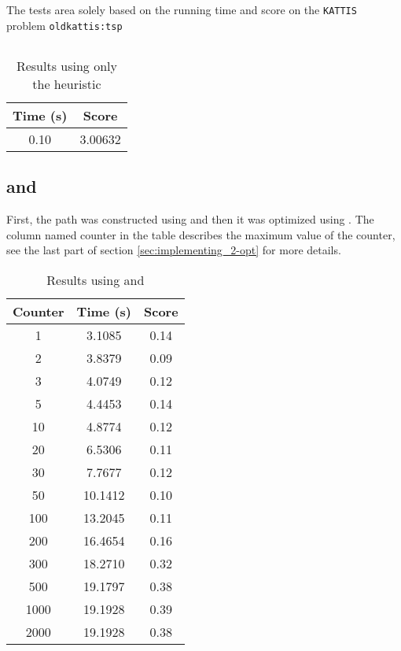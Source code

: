 The tests area solely based on the running time and score on the
\texttt{KATTIS}~\cite{kattis} problem \texttt{oldkattis:tsp}~\cite{kattis-tsp}

\subsection{}
\begin{table}[ht!]
    \centering
    \begin{tabular}{|c|c|}
        \hline 
        \textbf{Time (s)} & \textbf{Score} \\ \hline
        0.10 & 3.00632 \\ \hline
    \end{tabular}
    \caption{Results using only the  heuristic}
    \label{table:nn}
\end{table}

\subsection{ and }
First, the path was constructed using  and then it was
optimized using . The column named counter in the table describes
the maximum value of the counter, see the last part of section
\ref{sec:implementing_2-opt} for more details.
\begin{table}[ht!]
    \centering
    \begin{tabular}{|c|c|c|}
        \hline
        \textbf{Counter} & \textbf{Time (s)} & \textbf{Score} \\ \hline
            1 &  3.1085 & 0.14 \\ \hline
            2 &  3.8379 & 0.09 \\ \hline
            3 &  4.0749 & 0.12 \\ \hline
            5 &  4.4453 & 0.14 \\ \hline
           10 &  4.8774 & 0.12 \\ \hline
           20 &  6.5306 & 0.11 \\ \hline
           30 &  7.7677 & 0.12 \\ \hline
           50 & 10.1412 & 0.10 \\ \hline
          100 & 13.2045 & 0.11 \\ \hline
          200 & 16.4654 & 0.16 \\ \hline
          300 & 18.2710 & 0.32 \\ \hline
          500 & 19.1797 & 0.38 \\ \hline
         1000 & 19.1928 & 0.39 \\ \hline
         2000 & 19.1928 & 0.38 \\ \hline
    
    \end{tabular}
    \caption{Results using  and }
    \label{table:nn_and_2-opt}
\end{table}
